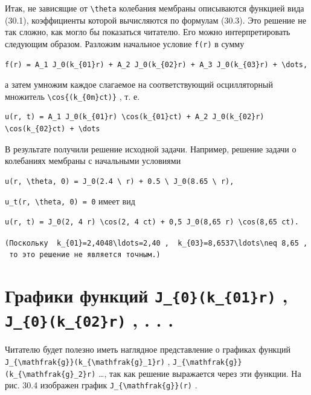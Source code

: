 \documentclass[
  ukrainian,
]{article}
\begin{document}
Итак, не зависящие от \texttt{\textbackslash{}theta} колебания мембраны
описываются функцией вида (30.1), коэффициенты которой вычисляются по
формулам (30.3). Это решение не так сложно, как могло бы показаться
читателю. Его можно интерпретировать следующим образом. Разложим
начальное условие \texttt{f(r)} в сумму

\begin{verbatim}
f(r) = A_1 J_0(k_{01}r) + A_2 J_0(k_{02}r) + A_3 J_0(k_{03}r) + \dots,
\end{verbatim}

а затем умножим каждое слагаемое на соответствующий осцилляторный
множитель \texttt{\textbackslash{}cos\{(k\_\{0m\}ct)\}} , т. е.

\begin{verbatim}
u(r, t) = A_1 J_0(k_{01}r) \cos(k_{01}ct) + A_2 J_0(k_{02}r) \cos(k_{02}ct) + \dots
\end{verbatim}

В результате получили решение исходной задачи. Например, решение задачи
о колебаниях мембраны с начальными условиями

\begin{verbatim}
u(r, \theta, 0) = J_0(2.4 \ r) + 0.5 \ J_0(8.65 \ r),
\end{verbatim}

\texttt{u\_t(r,\ \textbackslash{}theta,\ 0)\ =\ 0} имеет вид

\begin{verbatim}
u(r, t) = J_0(2, 4 r) \cos(2, 4 ct) + 0,5 J_0(8,65 r) \cos(8,65 ct).
\end{verbatim}

\texttt{(Поскольку\ \ \textquotesingle{}k\_\{01\}=2,4048\textbackslash{}ldots=2,40\textquotesingle{}\ ,\ \ \textquotesingle{}k\_\{03\}=8,6537\textbackslash{}ldots\textbackslash{}neq\ 8,65\textquotesingle{}\ ,\ то\ это\ решение\ не\ является\ точным.)}

\section{\texorpdfstring{Графики функций \texttt{J\_\{0\}(k\_\{01\}r)} ,
\texttt{J\_\{0\}(k\_\{02\}r)} , . .
.}{Графики функций J\_\{0\}(k\_\{01\}r) , J\_\{0\}(k\_\{02\}r) , . . .}}\label{ux433ux440ux430ux444ux438ux43aux438-ux444ux443ux43dux43aux446ux438ux439-j_0k_01r-j_0k_02r-.-.-.}

Читателю будет полезно иметь наглядное представление о графиках функций
\texttt{J\_\{\textbackslash{}mathfrak\{g\}\}(k\_\{\textbackslash{}mathfrak\{g\}\_1\}r)}
,
\texttt{J\_\{\textbackslash{}mathfrak\{g\}\}(k\_\{\textbackslash{}mathfrak\{g\}\_2\}r)}
\ldots, так как решение выражается через эти функции. На рис. 30.4
изображен график \texttt{J\_\{\textbackslash{}mathfrak\{g\}\}(r)} .
\end{document}

